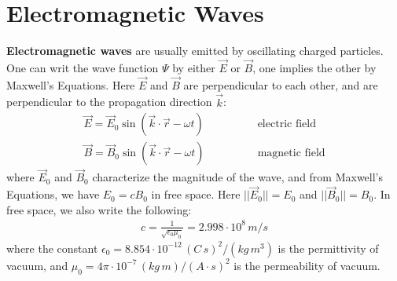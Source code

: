 \documentclass[11pt]{book}
\theoremstyle{break}
\theoremstyle{break}
\newcommand{\ee}[1]{\cdot 10^{#1}}
\begin{document}
\section[Electromagnetic Waves]{\color{red} Electromagnetic Waves\color{black}}
\textbf{Electromagnetic waves} are usually emitted by oscillating charged particles. One can writ the wave function $\Psi$ by either $\vec{E}$ or $\vec{B}$, one implies the other by Maxwell's Equations. Here $\vec{E}$ and $\vec{B}$ are perpendicular to each other, and are perpendicular to the propagation direction $\vec{k}$:
\begin{align*}
\vec{E} = \vec{E}_0\sin(\vec{k}\cdot \vec{r} -\omega t) \qquad\qquad &\text{electric field}\\
\vec{B} = \vec{B}_0 \sin(\vec{k}\cdot \vec{r}- \omega t)\qquad\qquad &\text{magnetic field}
\end{align*}
where $\vec{E}_0$ and $\vec{B}_0$ characterize the magnitude of the wave, and from Maxwell's Equations, we have $E_0 = c B_0$ in free space. Here $||\vec{E}_0|| = E_0$ and $||\vec{B}_0|| = B_0$. In free space, we also write the following:
\begin{align*}
c = \frac{1}{\sqrt{\epsilon_0 \mu_0}} = 2.998\cdot 10^{8}\, m/s
\end{align*}
where the constant $\epsilon_0= 8.854\ee{-12}\, (C\,s)^2/(kg\,m^3)$ is the permittivity of vacuum, and $\mu_0 =4\pi \cdot 10^{-7} \, (kg\, m)/(A\cdot s)^2$ is the permeability of vacuum. \\
\end{document}
